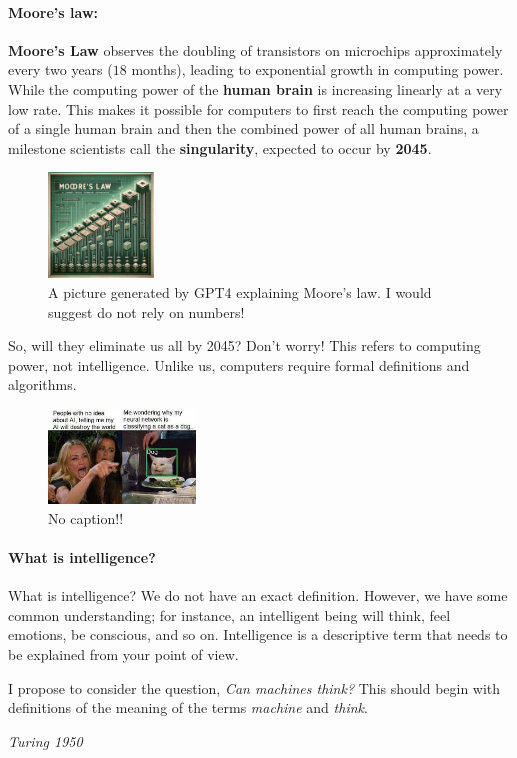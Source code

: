 \documentclass[%
 reprint,
 amsmath,amssymb,
 aps,
]{revtex4-2}
\begin{document}
\paragraph{\large Moore's law:}
\textbf{Moore's Law} observes the doubling of transistors on microchips approximately every two years ($18$ months), leading to exponential growth in computing power. While the computing power of the \textbf{human brain} is increasing linearly at a very low rate. This makes it possible for computers to first reach the computing power of a single human brain and then the combined power of all human brains, a milestone scientists call the \textbf{singularity}, expected to occur by \textbf{2045}.
\begin{figure}[H]
    \centering
    \includegraphics[width=0.25\textwidth]{images/gpt4_moore.png}
    \caption{\label{moore_law} A picture generated by GPT4 explaining Moore's law. I would suggest do not rely on numbers!}
\end{figure}
So, will they eliminate us all by 2045? Don't worry! This refers to computing power, not intelligence. Unlike us, computers require formal definitions and algorithms.
\begin{figure}[H]
    \centering
    \includegraphics[width=0.350\textwidth]{images/silly_ai.jpeg}
    \caption{\label{silly_ai} No caption!!}
\end{figure}

\paragraph{\large What is intelligence?}
What is intelligence? We do not have an exact definition. However, we have some common understanding; for instance, an intelligent being will think, feel emotions, be conscious, and so on. Intelligence is a descriptive term that needs to be explained from your point of view.
\epigraph{I propose to consider the question, \textit{Can machines think?} This should begin with definitions of the meaning of the terms \textit{machine} and \textit{think}.}{\textit{ Turing 1950}}
\end{document}
